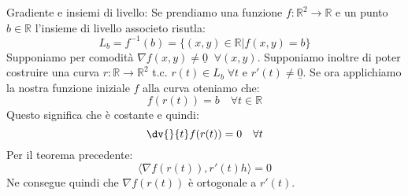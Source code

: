 Gradiente e insiemi di livello: Se prendiamo una funzione $f: \mathbb{R}^2 \to \mathbb{R}$ e un punto $b \in \mathbb{R}$ l'insieme di livello associeto risutla:
\begin{equation*}
	L_b = f^{-1}(b) = \{(x, y) \in \mathbb{R} | f(x, y) = b\}
\end{equation*}
Supponiamo per comodità $\nabla f(x, y) \neq \underline{0} \;\; \forall (x, y)$. Supponiamo inoltre di poter costruire una curva $r: \mathbb{R} \to \mathbb{R}^2$ t.c. $r(t) \in L_b \; \forall t$ e $r'(t) \neq \underline{0}$. Se ora applichiamo la nostra funzione iniziale $f$ alla curva oteniamo che:
\begin{equation*}
	f(r(t)) = b \quad \forall t \in \mathbb{R}
\end{equation*}
Questo significa che è costante e quindi:
\begin{equation*}
	\dv{}{t} f(r(t)) = 0 \quad \forall t
\end{equation*}
Per il teorema precedente:
\begin{equation*}
	\langle \nabla f(r(t)), r'(t)h \rangle = 0
\end{equation*}
Ne consegue quindi che $\nabla f(r(t))$ è ortogonale a $r'(t)$.
